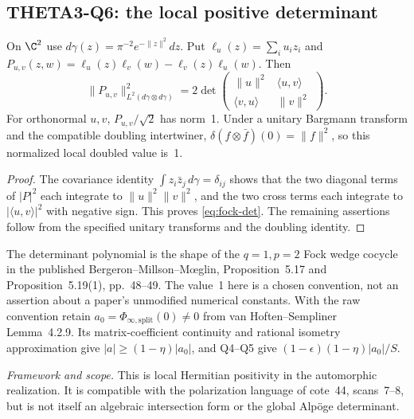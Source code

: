 \documentclass[11pt]{article}
\newcommand{\framework}[1]{\par\smallskip\noindent\textit{Framework and scope.} #1\par}
\theoremstyle{definition}\newtheorem{definition}[theorem]{Definition}\newtheorem{remark}[theorem]{Remark}
\begin{document}
\subsection{THETA3-Q6: the local positive determinant}\label{Q6}
On $\C^2$ use $d\gamma(z)=\pi^{-2}e^{-\|z\|^2}dz$. Put
$\ell_u(z)=\sum_i u_i z_i$ and
$P_{u,v}(z,w)=\ell_u(z)\ell_v(w)-\ell_v(z)\ell_u(w)$.
Then
\begin{equation}\label{eq:fock-det}
 \|P_{u,v}\|^2_{L^2(d\gamma\otimes d\gamma)}
 =2\det\begin{pmatrix}\|u\|^2&\langle u,v\rangle\\
 \langle v,u\rangle&\|v\|^2\end{pmatrix}.
\end{equation}
For orthonormal $u,v$, $P_{u,v}/\sqrt2$ has norm~1. Under a unitary Bargmann transform and the compatible doubling intertwiner,
$\delta(f\otimes\bar f)(0)=\|f\|^2$, so this normalized local doubled value is~1.
\begin{proof}
The covariance identity $\int z_i\bar z_j\,d\gamma=\delta_{ij}$ shows that the two diagonal terms of $|P|^2$ each integrate to $\|u\|^2\|v\|^2$, and the two cross terms each integrate to $|\langle u,v\rangle|^2$ with negative sign. This proves \eqref{eq:fock-det}. The remaining assertions follow from the specified unitary transforms and the doubling identity.
\end{proof}
The determinant polynomial is the shape of the $q=1,p=2$ Fock wedge cocycle in the published Bergeron--Millson--M\oe glin, Proposition~5.17 and Proposition~5.19(1), pp.~48--49. The value~1 here is a chosen convention, not an assertion about a paper's unmodified numerical constants. With the raw convention retain
$a_0=\Phi_{\infty,\mathrm{split}}(0)\ne0$ from van Hoften--Sempliner Lemma~4.2.9. Its matrix-coefficient continuity and rational isometry approximation give
$|a|\geq(1-\eta)|a_0|$, and Q4--Q5 give
$(1-\epsilon)(1-\eta)|a_0|/S$.
\framework{This is local Hermitian positivity in the automorphic realization. It is compatible with the polarization language of cote~44, scans~7--8, but is not itself an algebraic intersection form or the global Alp\"oge determinant.}
\end{document}
